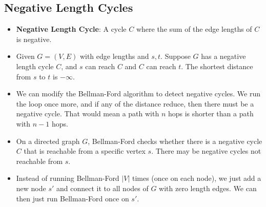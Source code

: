 \documentclass[12pt]{article}
\begin{document}
\subsection{Negative Length Cycles}
\begin{itemize}
    \item \textbf{Negative Length Cycle}: A cycle $C$ where the sum of the edge lengths of $C$ is negative.
    \item Given $G = (V, E)$ with edge lengths and $s, t$. Suppose $G$ has a negative length cycle $C$, and $s$ can reach $C$ and $C$ can reach $t$. The shortest distance from $s$ to $t$ is $-\infty$.
    \item We can modify the Bellman-Ford algorithm to detect negative cycles. We run the loop once more, and if any of the distance reduce, then there must be a negative cycle. That would mean a path with $n$ hops is shorter than a path with $n - 1$ hops.
    
    \item On a directed graph $G$, Bellman-Ford checks whether there is a negative cycle $C$ that is reachable from a specific vertex $s$. There may be negative cycles not reachable from $s$.
    \item Instead of running Bellman-Ford $\left|V\right|$ times (once on each node), we just add a new node $s'$ and connect it to all nodes of $G$ with zero length edges. We can then just run Bellman-Ford once on $s'$.
\end{itemize}
\end{document}
